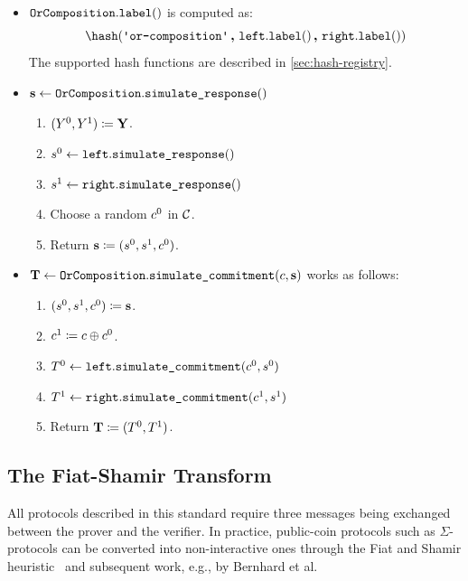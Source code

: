 \documentclass[11pt]{article}
\begin{document}
\begin{itemize}
\begin{enumerate}
      \item
	    Return $\pctrue$ if both $\leftbranch.\verifiertt(\commitment^0,\challenge^0,\response^0)$ and $\rightbranch.\verifiertt^1(\commitment^1,\challenge^1,\response^1)$ return $\pctrue$. Otherwise, return $\pcfalse$.
    \end{enumerate}
  \item  $\texttt{OrComposition}.\texttt{label}()$ is computed as:
    \[
     \hash(\orlabel \concat \leftbranch.\labeltt() \concat \rightbranch.\labeltt())
   \]
   The supported hash functions are described in \cref{sec:hash-registry}.
  \item
  $\mathbf {s} \gets \texttt{OrComposition}.\texttt{simulate\_response}()$
    \begin{enumerate}
      \item
         $(Y^0,Y^1)\coloneqq \mathbf {Y}$.
      \item
         $s^0\gets\texttt{left}.\texttt{simulate\_response}()$
      \item $s^1\gets\texttt{right}.\texttt{simulate\_response}()$
      \item
        Choose a random $c^0$ in $\mathcal{C}$.
			\item
        Return $\mathbf {s} \coloneqq (s^0,s^1,c^0)$.
    \end{enumerate}
\item
$\mathbf {T} \gets \texttt{OrComposition}.\texttt{simulate\_commitment}(c, \mathbf {s})$ works as follows:
\begin{enumerate}
      \item
        $(s^0,s^1,c^0)\coloneqq\mathbf{s}$.
      \item
        $c^1\coloneqq c \oplus c^0$.
      \item
        $T^0 \gets\texttt{left}.\texttt{simulate\_commitment}(c^0,s^0)$
    \item $T^1\gets\texttt{right}.\texttt{simulate\_commitment}(c^1,s^1)$
      \item
        Return $\mathbf {T} \coloneqq (T^0,T^1)$.
    \end{enumerate}
\end{itemize}


\subsection{The Fiat-Shamir Transform}\label{sec:fs}
All protocols described in this standard require three messages being exchanged between the prover and the verifier.
In practice, public-coin protocols such as $\Sigma$-protocols can be converted into non-interactive ones through the
Fiat and Shamir heuristic~\cite{C:FiaSha86} and subsequent work, e.g., by Bernhard et al.~\cite{AC:BerPerWar12}
\end{document}
